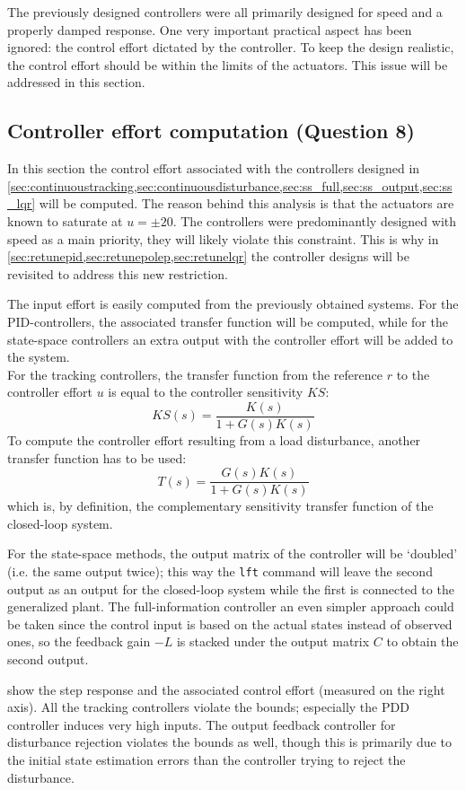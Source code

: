 The previously designed controllers were all primarily designed for speed and a properly damped response. One very important practical aspect has been ignored: the control effort dictated by the controller. To keep the design realistic, the control effort should be within the limits of the actuators. This issue will be addressed in this section.

\subsection{Controller effort computation \textnormal{\phantom{xxx}(Question 8)}}
In this section the control effort associated with the controllers designed in \cref{sec:continuoustracking,sec:continuousdisturbance,sec:ss_full,sec:ss_output,sec:ss_lqr} will be computed. The reason behind this analysis is that the actuators are known to saturate at $u = \pm20$. The controllers were predominantly designed with speed as a main priority, they will likely violate this constraint. This is why in \cref{sec:retunepid,sec:retunepolep,sec:retunelqr} the controller designs will be revisited to address this new restriction.

The input effort is easily computed from the previously obtained systems. For the PID-controllers, the associated transfer function will be computed, while for the state-space controllers an extra output with the controller effort will be added to the system.\\
\indent For the tracking controllers, the transfer function from the reference $r$ to the controller effort $u$ is equal to the controller sensitivity $KS$:
$$ KS(s) = \frac{K(s)}{1 + G(s)K(s)} $$
To compute the controller effort resulting from a load disturbance, another transfer function has to be used:
$$ T(s) = \frac{G(s)K(s)}{1 + G(s)K(s)}$$
which is, by definition, the complementary sensitivity transfer function of the closed-loop system. 

For the state-space methods, the output matrix of the controller will be `doubled' (i.e. the same output twice); this way the \texttt{lft} command will leave the second output as an output for the closed-loop system while the first is connected to the generalized plant. The full-information controller an even simpler approach could be taken since the control input is based on the actual states instead of observed ones, so the feedback gain $-L$ is stacked under the output matrix $C$ to obtain the second output.

 show the step response and the associated control effort (measured on the right axis). All the tracking controllers violate the bounds; especially the PDD controller induces very high inputs. The output feedback controller for disturbance rejection violates the bounds as well, though this is primarily due to the initial state estimation errors than the controller trying to reject the disturbance. 

